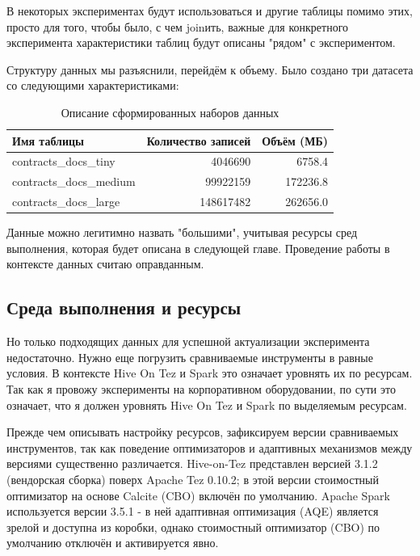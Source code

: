 \documentclass[12pt,letterpaper, onecolumn]{exam}
\begin{document}
В некоторых экспериментах будут использоваться и другие таблицы помимо этих, просто для того, чтобы было, с чем joinить, важные для конкретного эксперимента характеристики таблиц будут описаны "рядом" с экспериментом.

Структуру данных мы разъяснили, перейдём к объему. Было создано три датасета со следующими характеристиками:

\begin{table}[ht]
\centering
\caption{Описание сформированных наборов данных}
\label{tab:datasets}
\begin{tabular}{lrr}
\toprule
\textbf{Имя таблицы} & \textbf{Количество записей} & \textbf{Объём (МБ)} \\
\midrule
contracts\_docs\_tiny  & 4046690  & 6758.4  \\
contracts\_docs\_medium & 99922159  & 172236.8  \\
contracts\_docs\_large  & 148617482 & 262656.0  \\
\bottomrule
\end{tabular}
\end{table}

Данные можно легитимно назвать "большими", учитывая ресурсы сред выполнения, которая будет описана в следующей главе. Проведение работы в контексте данных считаю оправданным.

\subsection{Среда выполнения и ресурсы}

Но только подходящих данных для успешной актуализации эксперимента недостаточно. Нужно еще погрузить сравниваемые инструменты в равные условия. В контексте Hive On Tez и Spark это означает уровнять их по ресурсам. Так как я провожу эксперименты на корпоративном оборудовании, по сути это означает, что я должен уровнять Hive On Tez и Spark по выделяемым ресурсам.

Прежде чем описывать настройку ресурсов, зафиксируем версии сравниваемых
инструментов, так как поведение оптимизаторов и адаптивных механизмов между
версиями существенно различается. Hive-on-Tez представлен версией 3.1.2
(вендорская сборка) поверх Apache Tez 0.10.2; в этой версии стоимостный
оптимизатор на основе Calcite (CBO) включён по умолчанию. Apache Spark
используется версии 3.5.1 - в ней адаптивная оптимизация (AQE) является зрелой и доступна из коробки, однако стоимостный оптимизатор (CBO) по умолчанию отключён и активируется явно.
\end{document}
